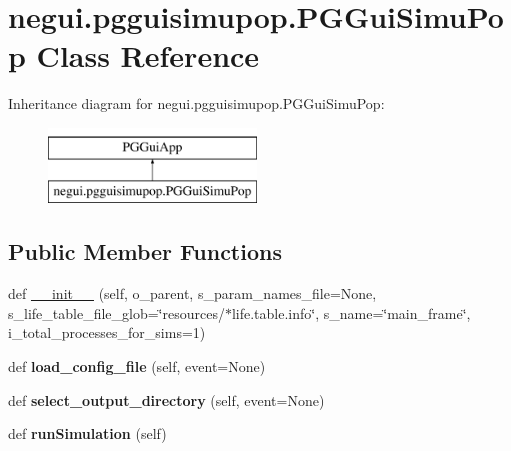 \hypertarget{classnegui_1_1pgguisimupop_1_1PGGuiSimuPop}{}\section{negui.\+pgguisimupop.\+P\+G\+Gui\+Simu\+Pop Class Reference}
\label{classnegui_1_1pgguisimupop_1_1PGGuiSimuPop}
Inheritance diagram for negui.\+pgguisimupop.\+P\+G\+Gui\+Simu\+Pop\+:\begin{figure}[H]
\begin{center}
\leavevmode
\includegraphics[height=2.000000cm]{classnegui_1_1pgguisimupop_1_1PGGuiSimuPop}
\end{center}
\end{figure}
\subsection*{Public Member Functions}
\begin{DoxyCompactItemize}
\item 
def \hyperlink{classnegui_1_1pgguisimupop_1_1PGGuiSimuPop_af11075f3f930571bc6ee336b79f8880e}{\+\_\+\+\_\+init\+\_\+\+\_\+} (self, o\+\_\+parent, s\+\_\+param\+\_\+names\+\_\+file=None, s\+\_\+life\+\_\+table\+\_\+file\+\_\+glob=\char`\"{}resources/$\ast$life.\+table.\+info\char`\"{}, s\+\_\+name=\char`\"{}main\+\_\+frame\char`\"{}, i\+\_\+total\+\_\+processes\+\_\+for\+\_\+sims=1)
\item 
def {\bfseries load\+\_\+config\+\_\+file} (self, event=None)\hypertarget{classnegui_1_1pgguisimupop_1_1PGGuiSimuPop_a9ae755614518ece6584d83aff129f4d5}{}\label{classnegui_1_1pgguisimupop_1_1PGGuiSimuPop_a9ae755614518ece6584d83aff129f4d5}

\item 
def {\bfseries select\+\_\+output\+\_\+directory} (self, event=None)\hypertarget{classnegui_1_1pgguisimupop_1_1PGGuiSimuPop_a4d88e502ff12249698177dbb4336715d}{}\label{classnegui_1_1pgguisimupop_1_1PGGuiSimuPop_a4d88e502ff12249698177dbb4336715d}

\item 
def {\bfseries run\+Simulation} (self)\hypertarget{classnegui_1_1pgguisimupop_1_1PGGuiSimuPop_a7dc99019295f2a2650fa95ecddd55239}{}\label{classnegui_1_1pgguisimupop_1_1PGGuiSimuPop_a7dc99019295f2a2650fa95ecddd55239}

\end{DoxyCompactItemize}
